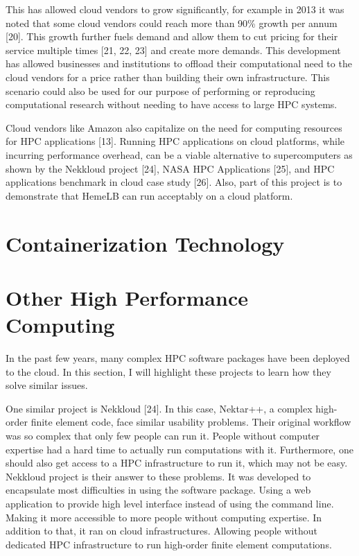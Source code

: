 This has allowed cloud vendors to grow significantly, for example in 2013 it was noted that some cloud vendors could reach more than 90\% growth per annum [20]. This growth further fuels demand and allow them to cut pricing for their service multiple times [21, 22, 23] and create more demands. This development has allowed businesses and institutions to offload their computational need to the cloud vendors for a price rather than building their own infrastructure. This scenario could also be used for our purpose of performing or reproducing computational research without needing to have access to large HPC systems.

Cloud vendors like Amazon also capitalize on the need for computing resources for HPC applications [13]. Running HPC applications on cloud platforms, while incurring performance overhead, can be a viable alternative to supercomputers as shown by the Nekkloud project [24], NASA HPC Applications [25], and HPC applications benchmark in cloud case study [26]. Also, part of this project is to demonstrate that HemeLB can run acceptably on a cloud platform.


\section{Containerization Technology}

\section{Other High Performance Computing}

In the past few years, many complex HPC software packages have been deployed to the cloud. In this section, I will highlight these projects to learn how they solve similar issues.

One similar project is Nekkloud [24]. In this case, Nektar++, a complex high-order finite element code, face similar usability problems. Their original workflow was so complex that only few people can run it. People without computer expertise had a hard time to actually run computations with it. Furthermore, one should also get access to a HPC infrastructure to run it, which may not be easy. Nekkloud project is their answer to these problems. It was developed to encapsulate most difficulties in using the software package. Using a web application to provide high level interface instead of using the command line. Making it more accessible to more people without computing expertise. In addition to that, it ran on cloud infrastructures. Allowing people without dedicated HPC infrastructure to run high-order finite element computations.

